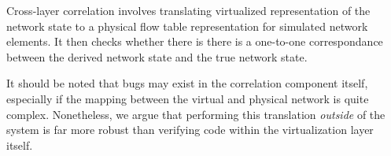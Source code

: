 Cross-layer correlation involves translating
virtualized representation of the network state to a physical flow table
representation for simulated network elements. It then checks whether there is
there is a one-to-one correspondance between the derived network
state and the true network state.

It should be noted that bugs may exist in the correlation component itself,
especially if the mapping between the virtual and physical network is quite
complex. Nonetheless, we argue that performing this
translation {\it outside} of the system is far more robust than verifying code within the
virtualization layer itself.


